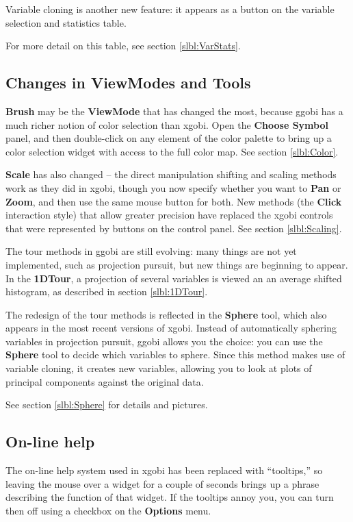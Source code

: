 \documentclass[11pt]{article}
\begin{document}
Variable cloning is another new feature: it appears as a button
on the variable selection and statistics table.

For more detail on this table, see section \ref{slbl:VarStats}.

\subsection{Changes in ViewModes and Tools}

{\bf Brush} may be the {\bf ViewMode} that has changed the most,
because ggobi has a much richer notion of color selection than
xgobi.  Open the {\bf Choose Symbol} panel, and then double-click on
any element of the color palette to bring up a color selection widget
with access to the full color map.  See section \ref{slbl:Color}.

{\bf Scale} has also changed -- the direct manipulation shifting and
scaling methods work as they did in xgobi, though you now specify
whether you want to {\bf Pan} or {\bf Zoom}, and then use the same
mouse button for both.  New methods (the {\bf Click} interaction
style) that allow greater precision have replaced the xgobi controls
that were represented by buttons on the control panel.  See section
\ref{slbl:Scaling}.

The tour methods in ggobi are still evolving:  many things are not
yet implemented, such as projection pursuit, but new things are
beginning to appear.  In the {\bf 1DTour}, a projection of several
variables is viewed an an average shifted histogram, as described
in section \ref{slbl:1DTour}.

The redesign of the tour methods is reflected in the {\bf Sphere}
tool, which also appears in the most recent versions of xgobi.
Instead of automatically sphering variables in projection pursuit,
ggobi allows you the choice:  you can use the {\bf Sphere} tool to
decide which variables to sphere.  Since this method makes use of
variable cloning, it creates new variables, allowing you to look at
plots of principal components against the original data.

See section \ref{slbl:Sphere} for details and pictures.

\subsection{On-line help}

The on-line help system used in xgobi has been replaced with
``tooltips,'' so leaving the mouse over a widget for a couple of
seconds brings up a phrase describing the function of that widget.
If the tooltips annoy you, you can turn then off using a
checkbox on the {\bf Options} menu.
\end{document}
